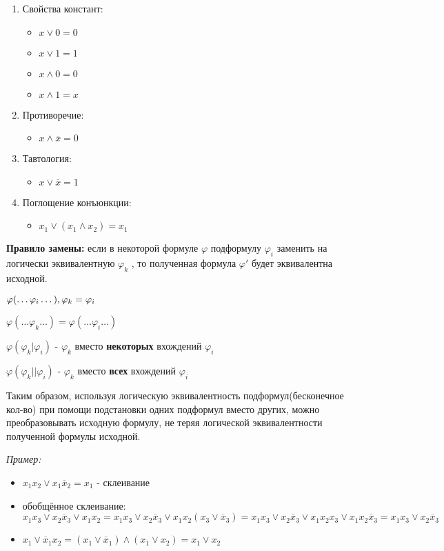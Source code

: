 \documentclass[10pt]{article}
\begin{document}
\begin{enumerate}
\begin{itemize}
        \end{itemize}
    \item Свойства констант:
        \begin{itemize}
            \item $x \lor 0 = 0$
            \item $x \lor 1 = 1$
            \item $x \land 0 = 0$
            \item $x \land 1 = x$
        \end{itemize}
    \item Противоречие:
        \begin{itemize}
            \item $x \land \overline x = 0$
        \end{itemize}
    \item Тавтология:
        \begin{itemize}
            \item $x \lor \overline x = 1$
        \end{itemize}
    \item Поглощение конъюнкции:
        \begin{itemize}
            \item $x_1 \lor (x_1 \land x_2) = x_1$
        \end{itemize}
\end{enumerate}

\par \textbf{Правило замены:} если в некоторой формуле $\varphi$ подформулу $\varphi_i$ заменить на логически эквивалентную $\varphi_k$ , то полученная формула $\varphi'$ будет эквивалентна исходной.
\par $\varphi (\dots \varphi_i \dots),\space \varphi_k = \varphi_i$
\par $\varphi (\dots \varphi_k \dots) = \varphi (\dots \varphi_i \dots)$
\par $\varphi (\varphi_k \vert \varphi_i)$ - $\varphi_k$ вместо \textbf{некоторых} вхождений $\varphi_i$
\par $\varphi (\varphi_k \vert \vert \varphi_i)$ - $\varphi_k$ вместо \textbf{всех} вхождений $\varphi_i$

\par Таким образом, используя логическую эквивалентность подформул(бесконечное кол-во) при помощи подстановки одних подформул вместо других, можно преобразовывать исходную формулу, не теряя логической эквивалентности полученной формулы исходной.
\par \textit{Пример:}
\begin{itemize}
    \item $x_1 x_2 \lor x_1 \overline x_2 = x_1$ - склеивание
    \item обобщённое склеивание: $x_1 x_3 \lor x_2 \overline x_3 \lor x_1 x_2 = x_1 x_3 \lor x_2 \overline x_3 \lor x_1 x_2 (x_3 \lor \overline x_3) = x_1 x_3 \lor x_2 \overline x_3 \lor x_1 x_2 x_3 \lor x_1 x_2 \overline x_3 = x_1 x_3 \lor x_2 \overline x_3$
    \item $x_1 \lor \overline x_1 x_2 = (x_1 \lor \overline x_1) \land (x_1 \lor x_2) = x_1 \lor x_2$
\end{itemize}
\end{document}
